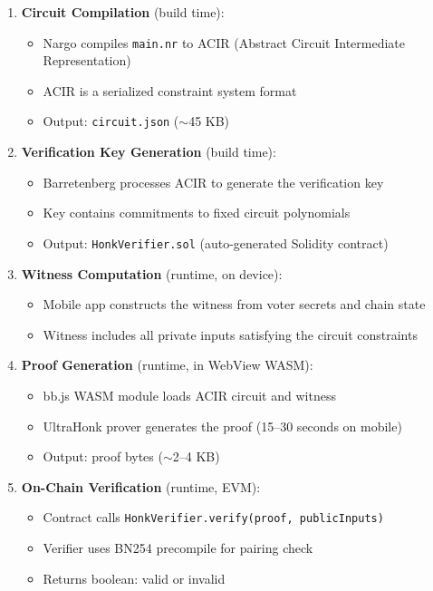 \begin{enumerate}
    \item \textbf{Circuit Compilation} (build time):
    \begin{itemize}
        \item Nargo compiles \texttt{main.nr} to ACIR (Abstract Circuit Intermediate Representation)
        \item ACIR is a serialized constraint system format
        \item Output: \texttt{circuit.json} ($\sim$45 KB)
    \end{itemize}
    
    \item \textbf{Verification Key Generation} (build time):
    \begin{itemize}
        \item Barretenberg processes ACIR to generate the verification key
        \item Key contains commitments to fixed circuit polynomials
        \item Output: \texttt{HonkVerifier.sol} (auto-generated Solidity contract)
    \end{itemize}
    
    \item \textbf{Witness Computation} (runtime, on device):
    \begin{itemize}
        \item Mobile app constructs the witness from voter secrets and chain state
        \item Witness includes all private inputs satisfying the circuit constraints
    \end{itemize}
    
    \item \textbf{Proof Generation} (runtime, in WebView WASM):
    \begin{itemize}
        \item bb.js WASM module loads ACIR circuit and witness
        \item UltraHonk prover generates the proof (15--30 seconds on mobile)
        \item Output: proof bytes ($\sim$2--4 KB)
    \end{itemize}
    
    \item \textbf{On-Chain Verification} (runtime, EVM):
    \begin{itemize}
        \item Contract calls \texttt{HonkVerifier.verify(proof, publicInputs)}
        \item Verifier uses BN254 precompile for pairing check
        \item Returns boolean: valid or invalid
    \end{itemize}
\end{enumerate}


